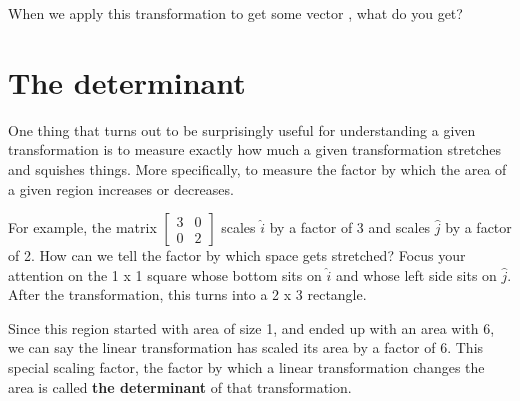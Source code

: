 \documentclass[12pt]{article}
\begin{document}
When we apply this transformation to get some vector , what do you get?


\section{The determinant}

One thing that turns out to be surprisingly useful for understanding a given transformation is to measure exactly how much a given transformation stretches and squishes things. More specifically, to measure the factor by which the area of a given region increases or decreases.


For example, the matrix $\begin{bmatrix} 3 & 0 \\ 0 & 2\end{bmatrix}$ scales $\hat{i}$ by a factor of 3 and scales $\hat{j}$ by a factor of 2. How can we tell the factor by which space gets stretched? Focus your attention on the 1 x 1 square whose bottom sits on $\hat{i}$ and whose left side sits on $\hat{j}$. After the transformation, this turns into a 2 x 3 rectangle.


Since this region started with area of size 1, and ended up with an area with 6, we can say the linear transformation has scaled its area by a factor of 6. This special scaling factor, the factor by which a linear transformation changes the area is called \textbf{the determinant} of that transformation.
\end{document}
